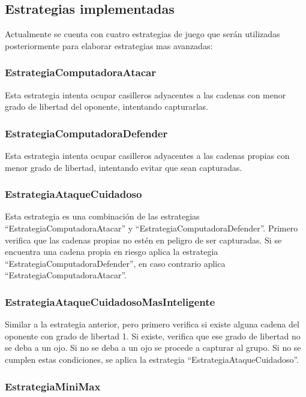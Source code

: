 \documentclass[11pt]{article}
\begin{document}
\newpage

\subsection{Estrategias implementadas}
\label{sec-4.3}

   Actualmente se cuenta con cuatro estrategias de juego que serán
   utilizadas posteriormente para elaborar estrategias mas avanzadas:
\subsubsection{EstrategiaComputadoraAtacar}
\label{sec-4.3.1}

    Esta estrategia intenta ocupar casilleros adyacentes a las cadenas
    con menor grado de libertad del oponente, intentando capturarlas.
\subsubsection{EstrategiaComputadoraDefender}
\label{sec-4.3.2}

    Esta estrategia intenta ocupar casilleros adyacentes a las cadenas
    propias con menor grado de libertad, intentando evitar que sean
    capturadas.
\subsubsection{EstrategiaAtaqueCuidadoso}
\label{sec-4.3.3}

    Esta estrategia es una combinación de las estrategias
    ``EstrategiaComputadoraAtacar'' y
    ``EstrategiaComputadoraDefender''. Primero verifica que las
    cadenas propias no estén en peligro de ser capturadas. Si se
    encuentra una cadena propia en riesgo aplica la estrategia
    ``EstrategiaComputadoraDefender'', en caso contrario aplica
    ``EstrategiaComputadoraAtacar''.
\subsubsection{EstrategiaAtaqueCuidadosoMasInteligente}
\label{sec-4.3.4}

    Similar a la estrategia anterior, pero primero verifica si existe
    alguna cadena del oponente con grado de libertad 1. Si existe,
    verifica que ese grado de libertad no se deba a un ojo. Si no se
    deba a un ojo se procede a capturar al grupo. Si no se cumplen
    estas condiciones, se aplica la estrategia
    ``EstrategiaAtaqueCuidadoso''.

\subsubsection{EstrategiaMiniMax}
\end{document}
